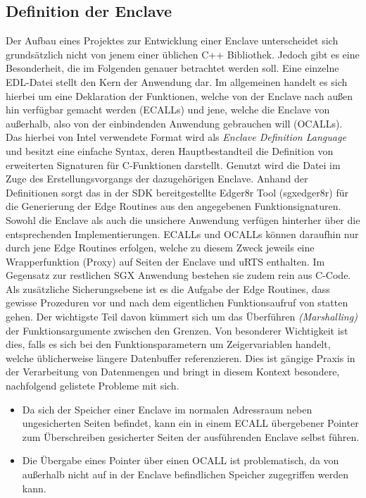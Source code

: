 \subsection{Definition der Enclave}
Der Aufbau eines Projektes zur Entwicklung einer Enclave unterscheidet sich grundsätzlich nicht von jenem einer üblichen C++ Bibliothek. Jedoch gibt es eine Besonderheit, die im Folgenden genauer betrachtet werden soll. Eine einzelne EDL-Datei stellt den Kern der Anwendung dar. Im allgemeinen handelt es sich hierbei um eine Deklaration der Funktionen, welche von der Enclave nach außen hin verfügbar gemacht werden (ECALLs) und jene, welche die Enclave von außerhalb, also von der einbindenden Anwendung gebrauchen will (OCALLs). Das hierbei von Intel verwendete Format wird als \textit{Enclave Definition Language} und besitzt eine einfache Syntax, deren Hauptbestandteil die Definition von erweiterten Signaturen für C-Funktionen darstellt. Genutzt wird die Datei im Zuge des Erstellungsvorgangs der dazugehörigen Enclave. Anhand der Definitionen sorgt das in der SDK bereitgestellte Edger8r Tool (sgx\textunderscore edger8r) für die Generierung der Edge Routines aus den angegebenen Funktionsignaturen. Sowohl die Enclave als auch die unsichere Anwendung verfügen hinterher über die entsprechenden Implementierungen. ECALLs und OCALLs können daraufhin nur durch jene Edge Routines erfolgen, welche zu diesem Zweck jeweils eine Wrapperfunktion (Proxy) auf Seiten der Enclave und uRTS enthalten. Im Gegensatz zur restlichen SGX Anwendung bestehen sie zudem rein aus C-Code. Als zusätzliche Sicherungsebene ist es die Aufgabe der Edge Routines, dass gewisse Prozeduren vor und nach dem eigentlichen Funktionsaufruf von statten gehen. Der wichtigste Teil davon kümmert sich um das Überführen \textit{(Marshalling)} der Funktionsargumente zwischen den Grenzen. Von besonderer Wichtigkeit ist dies, falls es sich bei den Funktionsparametern um Zeigervariablen handelt, welche üblicherweise längere Datenbuffer referenzieren. Dies ist gängige Praxis in der Verarbeitung von Datenmengen und bringt in diesem Kontext besondere, nachfolgend gelistete Probleme mit sich.

\begin{itemize}
	\item Da sich der Speicher einer Enclave im normalen Adressraum neben ungesicherten Seiten befindet, kann ein in einem ECALL übergebener Pointer zum Überschreiben gesicherter Seiten der ausführenden Enclave selbst führen.
	\item Die Übergabe eines Pointer über einen OCALL ist problematisch, da von außerhalb nicht auf in der Enclave befindlichen Speicher zugegriffen werden kann.
\end{itemize}

